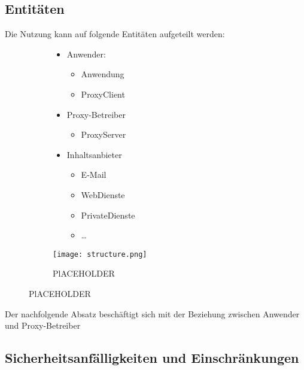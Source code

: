 \documentclass[12pt, a4paper]{scrartcl}
\begin{document}
\subsection{Entitäten}
Die Nutzung kann auf folgende Entitäten aufgeteilt werden:
\begin{figure}[H]
    \centering
    \begin{subfigure}{0.45\textwidth}
        \begin{itemize}
            \item Anwender:
            \begin{itemize}
                \item Anwendung
                \item ProxyClient
            \end{itemize}
            \item Proxy-Betreiber
            \begin{itemize}
                \item ProxyServer
            \end{itemize}
            \item Inhaltsanbieter
            \begin{itemize}
                \item E-Mail
                \item WebDienste
                \item PrivateDienste
                \item \ldots
            \end{itemize}
        \end{itemize}
    \end{subfigure}
    \begin{subfigure}{0.5\textwidth}
        \centering
        \texttt{[image: structure.png]}
        \caption{PlACEHOLDER}
        \label{fig::enti}
    \end{subfigure}
\end{figure}

\noindent Der nachfolgende Absatz beschäftigt sich mit der Beziehung zwischen Anwender und Proxy-Betreiber
\subsection{Sicherheitsanfälligkeiten und Einschränkungen}
\end{document}
